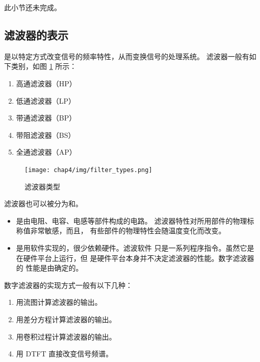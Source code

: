 \begin{note}
    此小节还未完成。
\end{note}

\subsection{滤波器的表示}

\begin{definition}
    是以特定方式改变信号的频率特性，从而变换信号的处理系统。
    滤波器一般有如下类别，如图 \ref{fig:filter_types} 所示：
    \begin{enumerate}[label=(\arabic*)]
        \item 高通滤波器（HP）
        \item 低通滤波器（LP）
        \item 带通滤波器（BP）
        \item 带阻滤波器（BS）
        \item 全通滤波器（AP）
    \end{enumerate}
    \begin{figure}[H]
        \centering
        \texttt{[image: chap4/img/filter\_types.png]}
        \caption{滤波器类型}
        \label{fig:filter_types}
    \end{figure}

    滤波器也可以被分为和。
    \begin{itemize}
        \item {}是由电阻、电容、电感等部件构成的电路。
            滤波器特性对所用部件的物理标称值非常敏感，而且，
            有些部件的物理特性会随温度变化而改变。
        \item {}是用软件实现的，很少依赖硬件。滤波软件
            只是一系列程序指令。虽然它是在硬件平台上运行，但
            是硬件平台本身并不决定滤波器的性能。数字滤波器的
            性能是由确定的。
    \end{itemize}
    数字滤波器的实现方式一般有以下几种：
    \begin{enumerate}
        \item 用流图计算滤波器的输出。
        \item 用差分方程计算滤波器的输出。
        \item 用卷积过程计算滤波器的输出。
        \item 用 DTFT 直接改变信号频谱。
    \end{enumerate}
\end{definition}

